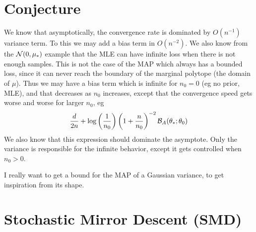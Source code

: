 \documentclass{article}
\newcommand{\logpart}{A}
\newcommand{\bregman}{\cB_\logpart}
\newcommand{\natp}{\theta}
\begin{document}
\section{Conjecture}

We know that asymptotically, the convergence rate is dominated by $O(n^{-1})$ variance term. To this we may add a bias term in $O(n^{-2})$. 
We also know from the ${\mathcal N}(0,\mu_*)$ example that the MLE can have infinite loss when there is not enough samples. This is not the case of the MAP which always has a bounded loss, since it can never reach the boundary of the marginal polytope (the domain of $\mu$). Thus we may have a bias term which is infinite for $n_0=0$ (eg no prior, MLE), and that decreases as $n_0$ increases, except that the convergence speed gets worse and worse for larger $n_0$, eg
\begin{align}
    \frac{d}{2n} +  \log \left (\inv{n_0} \right) \left(1+ \frac{n}{n_0} \right)^{-2} \bregman(\natp_*; \natp_0)
\end{align}
We also know that this expression should dominate the asymptote.
Only the variance is responsible for the infinite behavior, except it gets controlled when $n_0>0$.

I really want to get a bound for the MAP of a Gaussian variance, to get inspiration from its shape. 


\section{Stochastic Mirror Descent (SMD)}
\end{document}
